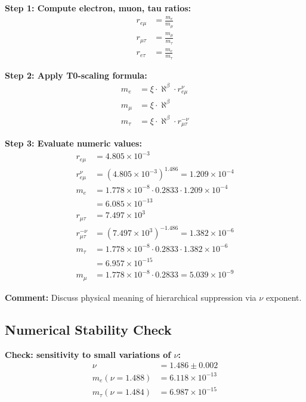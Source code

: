 \documentclass[12pt,a4paper]{article}
\newcommand{\xipar}{\xi}            %
\newcommand{\nulep}{\nu}            %
\begin{document}
\textbf{Step 1: Compute electron, muon, tau ratios:}
\begin{align}
	r_{e\mu} &= \frac{m_e}{m_\mu} \\
	r_{\mu\tau} &= \frac{m_\mu}{m_\tau} \\
	r_{e\tau} &= \frac{m_e}{m_\tau}
\end{align}

\textbf{Step 2: Apply T0-scaling formula:}
\begin{align}
	m_e &= \xipar \cdot \aleph^\beta \cdot r_{e\mu}^{\nulep} \\
	m_\mu &= \xipar \cdot \aleph^\beta \\
	m_\tau &= \xipar \cdot \aleph^\beta \cdot r_{\mu\tau}^{-\nulep}
\end{align}

\textbf{Step 3: Evaluate numeric values:}
\begin{align}
	r_{e\mu} &= 4.805 \times 10^{-3} \\
	r_{e\mu}^{\nulep} &= (4.805 \times 10^{-3})^{1.486} = 1.209 \times 10^{-4} \\
	m_e &= 1.778 \times 10^{-8} \cdot 0.2833 \cdot 1.209 \times 10^{-4} \\
	&= 6.085 \times 10^{-13} \\
	r_{\mu\tau} &= 7.497 \times 10^3 \\
	r_{\mu\tau}^{-\nulep} &= (7.497 \times 10^3)^{-1.486} = 1.382 \times 10^{-6} \\
	m_\tau &= 1.778 \times 10^{-8} \cdot 0.2833 \cdot 1.382 \times 10^{-6} \\
	&= 6.957 \times 10^{-15} \\
	m_\mu &= 1.778 \times 10^{-8} \cdot 0.2833 = 5.039 \times 10^{-9}
\end{align}

\textbf{Comment:} Discuss physical meaning of hierarchical suppression via $\nulep$ exponent.

\subsection{Numerical Stability Check}

\textbf{Check: sensitivity to small variations of $\nulep$:}
\begin{align}
	\nulep &= 1.486 \pm 0.002 \\
	m_e(\nulep = 1.488) &= 6.118 \times 10^{-13} \\
	m_\tau(\nulep = 1.484) &= 6.987 \times 10^{-15}
\end{align}
\end{document}
